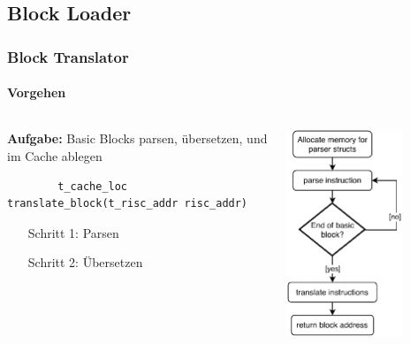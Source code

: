 \documentclass[german]{tum-presentation}
\begin{document}
\subsection{Block Loader} %
\begin{frame}[fragile]
\frametitle{Block Translator}
\framesubtitle{Vorgehen}
\begin{columns}[T]
	\begin{column}{0.7\textwidth}
		\textbf{Aufgabe:}    Basic Blocks parsen, übersetzen, und im Cache ablegen
		\begin{lstlisting}
		t_cache_loc translate_block(t_risc_addr risc_addr)
		\end{lstlisting}
		\vspace{1cm}
		\pause
		\begin{itemize}
			\setlength{\itemindent}{2cm}
			\item[Schritt 1:] Parsen
			\item[Schritt 2:] Übersetzen
		\end{itemize}
	\end{column}
	\begin{column}{0.29\textwidth}
		\includegraphics[width=0.7\textwidth]{diagrams/blocktranslate}
	\end{column}
\end{columns}
\end{frame}
\end{document}
